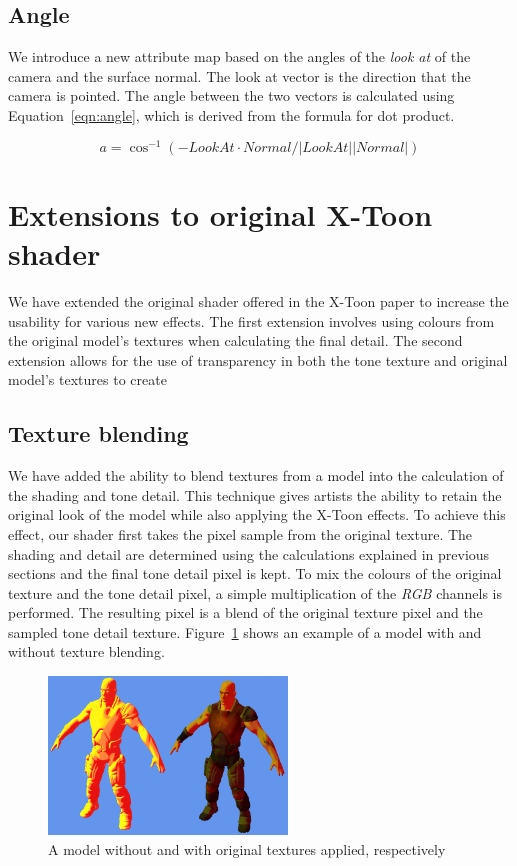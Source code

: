 \documentclass[annual]{acmsiggraph}
\begin{document}
\subsection{Angle}
We introduce a new attribute map based on the angles of the {\it{look at}} of the camera and the surface normal. The look at vector is the direction that the camera is pointed. The angle between the two vectors is calculated using Equation~\ref{eqn:angle}, which is derived from the formula for dot product.

\begin{equation}
\label{eqn:angle}
a = \cos^{-1}{(-LookAt \cdot Normal / |LookAt||Normal|)}
\end{equation}

\section{Extensions to original X-Toon shader}
\label{sec:extensions}
We have extended the original shader offered in the X-Toon paper to increase the usability for various new effects. The first extension involves using colours from the original model's textures when calculating the final detail. The second extension allows for the use of transparency in both the tone texture and original model's textures to create 

\subsection{Texture blending}
We have added the ability to blend textures from a model into the calculation of the shading and tone detail. This technique gives artists the ability to retain the original look of the model while also applying the X-Toon effects. To achieve this effect, our shader first takes the pixel sample from the original texture. The shading and detail are determined using the calculations explained in previous sections and the final tone detail pixel is kept. To mix the colours of the original texture and the tone detail pixel, a simple multiplication of the {\it{RGB}} channels is performed. The resulting pixel is a blend of the original texture pixel and the sampled tone detail texture. Figure~\ref{fig:texturing} shows an example of a model with and without texture blending.

\begin{figure}
	\centering
	\includegraphics[width=2.5in]{images/textures}
	\caption{A model without and with original textures applied, respectively}
	\label{fig:texturing}
\end{figure}
\end{document}
